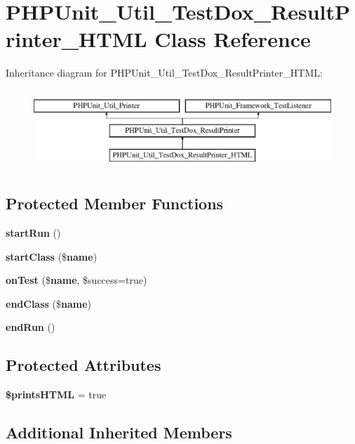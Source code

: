\section{P\+H\+P\+Unit\+\_\+\+Util\+\_\+\+Test\+Dox\+\_\+\+Result\+Printer\+\_\+\+H\+T\+M\+L Class Reference}
\label{class_p_h_p_unit___util___test_dox___result_printer___h_t_m_l}
Inheritance diagram for P\+H\+P\+Unit\+\_\+\+Util\+\_\+\+Test\+Dox\+\_\+\+Result\+Printer\+\_\+\+H\+T\+M\+L\+:\begin{figure}[H]
\begin{center}
\leavevmode
\includegraphics[height=3.000000cm]{class_p_h_p_unit___util___test_dox___result_printer___h_t_m_l}
\end{center}
\end{figure}
\subsection*{Protected Member Functions}
\begin{DoxyCompactItemize}
\item 
{\bf start\+Run} ()
\item 
{\bf start\+Class} (\${\bf name})
\item 
{\bf on\+Test} (\${\bf name}, \$success=true)
\item 
{\bf end\+Class} (\${\bf name})
\item 
{\bf end\+Run} ()
\end{DoxyCompactItemize}
\subsection*{Protected Attributes}
\begin{DoxyCompactItemize}
\item 
{\bf \$prints\+H\+T\+M\+L} = true
\end{DoxyCompactItemize}
\subsection*{Additional Inherited Members}


